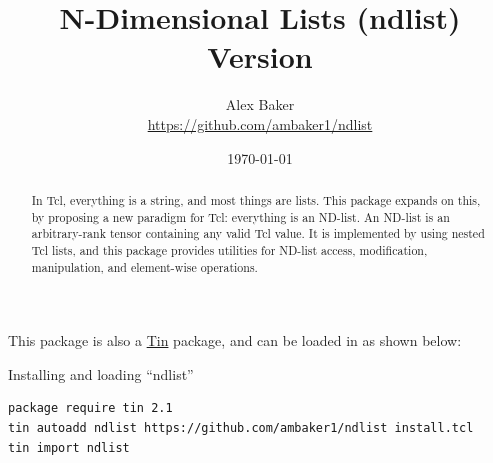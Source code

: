 \documentclass{article}
\title{\Huge{N-Dimensional Lists (ndlist)}\\\large Version \version}
\author{Alex Baker\\\small\url{https://github.com/ambaker1/ndlist}}
\date{\small\today}
\begin{document}
\maketitle
\begin{abstract}
In Tcl, everything is a string, and most things are lists. This package expands on this, by proposing a new paradigm for Tcl: everything is an ND-list. An ND-list is an arbitrary-rank tensor containing any valid Tcl value. It is implemented by using nested Tcl lists, and this package provides utilities for ND-list access, modification, manipulation, and element-wise operations.
\end{abstract}
\vspace{20 pt}

This package is also a \textcolor{blue}{\href{https://github.com/ambaker1/Tin}{Tin}} package, and can be loaded in as shown below:
\begin{example}{Installing and loading ``ndlist''}
\begin{lstlisting}
package require tin 2.1
tin autoadd ndlist https://github.com/ambaker1/ndlist install.tcl
tin import ndlist
\end{lstlisting}
\end{example}

\clearpage




{\footnotesize \printindex}
\end{document}
